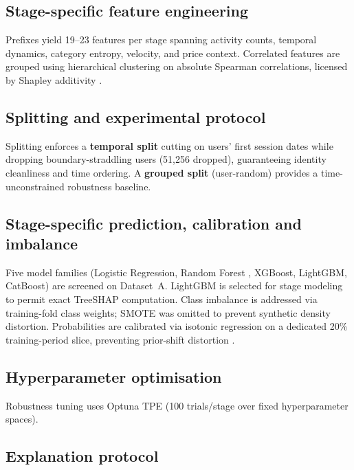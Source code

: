 \documentclass[a4paper]{article}
\begin{document}
\subsection{Stage-specific feature engineering}
\label{sec:methods-features}

Prefixes yield 19--23 features per stage spanning activity counts, temporal dynamics,
category entropy, velocity, and price context. Correlated features are grouped using
hierarchical clustering on absolute Spearman correlations, licensed by Shapley
additivity \citep{aas2021explaining}.

\subsection{Splitting and experimental protocol}
\label{sec:methods-splits}

Splitting enforces a \textbf{temporal split} cutting on users' first session dates
while dropping boundary-straddling users (51,256 dropped), guaranteeing identity
cleanliness and time ordering. A \textbf{grouped split} (user-random) provides a
time-unconstrained robustness baseline.

\subsection{Stage-specific prediction, calibration and imbalance}
\label{sec:methods-prediction}

Five model families (Logistic Regression, Random Forest \citep{breiman2001random},
XGBoost, LightGBM, CatBoost) are screened on Dataset~A. LightGBM is selected for
stage modeling to permit exact TreeSHAP computation. Class imbalance is addressed
via training-fold class weights; SMOTE \citep{chawla2002smote} was omitted to prevent
synthetic density distortion. Probabilities are calibrated via isotonic regression
\citep{niculescu2005predicting} on a dedicated 20\% training-period slice, preventing
prior-shift distortion \citep{saerens2002adjusting}.

\subsection{Hyperparameter optimisation}
\label{sec:methods-tuning}

Robustness tuning uses Optuna TPE \citep{akiba2019optuna} (100 trials/stage over fixed
hyperparameter spaces).

\subsection{Explanation protocol}
\label{sec:methods-explain}
\end{document}
